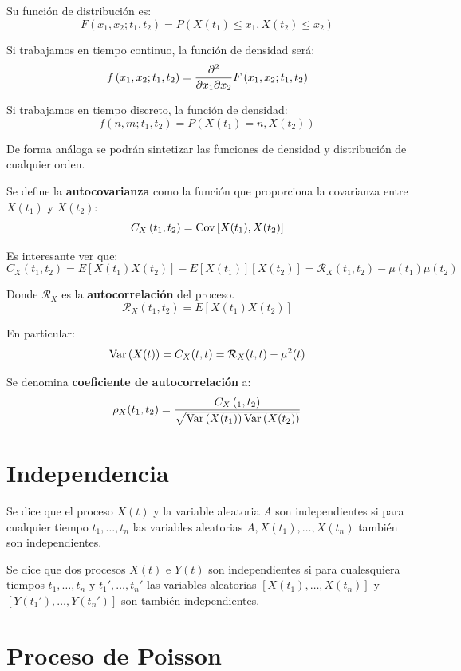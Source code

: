 \documentclass[a4paper]{book}
\begin{document}
Su función de distribución es:
\[ F \left( x_1,x_2;t_1,t_2 \right) = P \left( X(t_1) \leq x_1, X(t_2) \leq x_2 \right) \]

Si trabajamos en tiempo continuo, la función de densidad será:
\[ f \left( x_1,x_2;t_1,t_2 \right) = \pdv{}{x_1}{x_2}F \left( x_1,x_2;t_1,t_2 \right)  \]

Si trabajamos en tiempo discreto, la función de densidad:
\[ f \left( n,m;t_1,t_2 \right) = P \left( X(t_1) = n, X(t_2) \right) \]

De forma análoga se podrán sintetizar las funciones de densidad y distribución de cualquier orden.

Se define la \textbf{autocovarianza} como la función que proporciona la covarianza entre $X(t_1)$ y $X(t_2)$:
\[ C_X \left( t_1,t_2 \right)= \operatorname{Cov} \left[  X(t_1), X(t_2)\right] \]

Es interesante ver que:
\[ C_X \left( t_1,t_2 \right) = E \left[ X(t_1)X(t_2) \right] - E \left[ X(t_1)\right]\left[ X(t_2)\right] = \mathcal{R}_X \left( t_1,t_2 \right) - \mu (t_1)\mu (t_2)\]

Donde $\mathcal{R}_X$ es la \textbf{autocorrelación} del proceso.
\[\mathcal{R}_X \left( t_1,t_2 \right) = E \left[ X(t_1)X(t_2) \right]\]

En particular:
\[ \operatorname{Var} \left( X(t) \right) = C_X(t,t) = \mathcal{R}_X(t,t)-\mu ^2(t) \]

Se denomina \textbf{coeficiente de autocorrelación} a:
\[ \rho _X(t_1,t_2) = \frac{C_X \left( _1,t_2 \right)}{\sqrt{\operatorname{Var} \left( X(t_1) \right) \operatorname{Var} \left( X(t_2) \right)}} \]

\section{Independencia}

Se dice que el proceso $X(t)$ y la variable aleatoria $A$ son independientes si para cualquier tiempo $t_1,\dots ,t_n$ las variables aleatorias $A, X(t_1), \dots ,X(t_n)$ también son independientes.

Se dice que dos procesos $X(t)$ e $Y(t)$ son independientes si para cualesquiera tiempos $t_1, \dots , t_n$ y $t_1', \dots , t_n'$ las variables aleatorias $\left[ X(t_1), \dots , X(t_n) \right]$ y $\left[ Y(t_1'), \dots , Y(t_n') \right]$ son también independientes.

\section{Proceso de Poisson}
\end{document}
